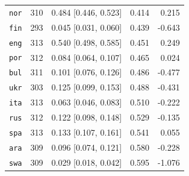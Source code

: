 \begin{table}[htbp]
\begin{minipage}[t]{0.485\linewidth}
{\begin{tabular}{@{}lrrrr@{}}
\texttt{nor} & 310 & 0.484 [0.446, 0.523] & 0.414 & 0.215 \\
\texttt{fin} & 293 & 0.045 [0.031, 0.060] & 0.439 & -0.643 \\
\texttt{eng} & 313 & 0.540 [0.498, 0.585] & 0.451 & 0.249 \\
\texttt{por} & 312 & 0.084 [0.064, 0.107] & 0.465 & 0.024 \\
\texttt{bul} & 311 & 0.101 [0.076, 0.126] & 0.486 & -0.477 \\
\texttt{ukr} & 303 & 0.125 [0.099, 0.153] & 0.488 & -0.431 \\
\texttt{ita} & 313 & 0.063 [0.046, 0.083] & 0.510 & -0.222 \\
\texttt{rus} & 312 & 0.122 [0.098, 0.148] & 0.529 & -0.135 \\
\texttt{spa} & 313 & 0.133 [0.107, 0.161] & 0.541 & 0.055 \\
\texttt{ara} & 309 & 0.096 [0.074, 0.121] & 0.580 & -0.228 \\
\texttt{swa} & 309 & 0.029 [0.018, 0.042] & 0.595 & -1.076 \\
\bottomrule
\end{tabular}}
\end{minipage}
\end{table}

